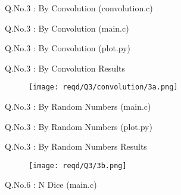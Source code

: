 \documentclass{beamer}
\begin{document}
\begin{frame}{Q.No.3 : By Convolution (convolution.c)}
	
\end{frame}


\begin{frame}{Q.No.3 : By Convolution (main.c)}
	
\end{frame}


\begin{frame}{Q.No.3 : By Convolution (plot.py)}
	
\end{frame}


\begin{frame}{Q.No.3 : By Convolution Results}
	\begin{figure}
		\centering
		\texttt{[image: reqd/Q3/convolution/3a.png]}
	\end{figure}
\end{frame}


\begin{frame}{Q.No.3 : By Random Numbers (main.c)}
	
\end{frame}


\begin{frame}{Q.No.3 : By Random Numbers (plot.py)}
	
\end{frame}


\begin{frame}{Q.No.3 : By Random Numbers Results}
	\begin{figure}
		\centering
		\texttt{[image: reqd/Q3/3b.png]}
	\end{figure}
\end{frame}


\begin{frame}{Q.No.6 : N Dice (main.c)}
	
\end{frame}
\end{document}
